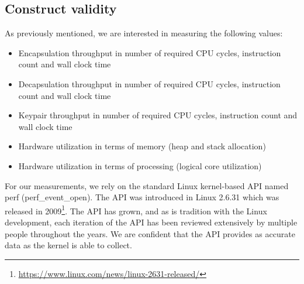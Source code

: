 

\subsection{Construct validity}



As previously mentioned, we are interested in measuring the following values:

\begin{itemize}
    \item Encapsulation throughput in number of required CPU cycles, instruction count and wall clock time
    \item Decapsulation throughput in number of required CPU cycles, instruction count and wall clock time
    \item Keypair throughput in number of required CPU cycles, instruction count and wall clock time
    \item Hardware utilization in terms of memory (heap and stack allocation)
    \item Hardware utilization in terms of processing (logical core utilization)
\end{itemize}

For our measurements, we rely on the standard Linux kernel-based API named perf (perf\_event\_open). The API was introduced in Linux 2.6.31 which was released in 2009\footnote{\href{https://www.linux.com/news/linux-2631-released/}{https://www.linux.com/news/linux-2631-released/}}. The API has grown, and as is tradition with the Linux development, each iteration of the API has been reviewed extensively by multiple people throughout the years. We are confident that the API provides as accurate data as the kernel is able to collect.

